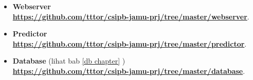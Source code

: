 \begin{itemize}
\item \textbf{Webserver}\\
\href{https://github.com/tttor/csipb-jamu-prj/tree/master/webserver}{\textbf{https://github.com/tttor/csipb-jamu-prj/tree/master/webserver}}.
\item \textbf{Predictor}\\
\href{https://github.com/tttor/csipb-jamu-prj/tree/master/predictor}{\textbf{https://github.com/tttor/csipb-jamu-prj/tree/master/predictor}}.
\item \textbf{Database} (lihat bab \ref{db chapter} )\\
\href{https://github.com/tttor/csipb-jamu-prj/tree/master/database}{\textbf{https://github.com/tttor/csipb-jamu-prj/tree/master/database}}.
\end{itemize}
